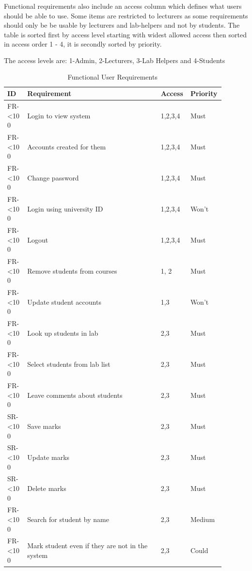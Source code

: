\documentclass[12pt]{article}  %
\newcommand{\rid}[1]{\centering #1-\ifnum\value{requirement}<10 0\fi\arabic{requirement} \stepcounter{requirement}}
\begin{document}
Functional requirements also include an access column which defines what users should be able to use. Some items are restricted to lecturers as some requirements should only be be usable by lecturers and lab-helpers and not by students. The table is sorted first by access level starting with widest allowed access then sorted in access order 1 - 4, it is secondly sorted by priority.

The access levels are: 1-Admin, 2-Lecturers, 3-Lab Helpers and 4-Students

\begin{spacing}{1.5}
\begin{longtable}{|p{0.09\linewidth}|p{0.6\linewidth}|p{0.1\linewidth}|
p{0.1\linewidth}|}
\caption{Functional User Requirements} \label{table:funct-user} \\ \hline
\textbf{ID} & \textbf{Requirement} & \textbf{Access} & \textbf{Priority}\\
\hline \hline

\rowcolor{Gray} \rid{FR} & Login to view system & 1,2,3,4 & Must\\ \hline
\rid{FR} &  Accounts created for them & 1,2,3,4 & Must\\ \hline
\rid{FR} &  Change password & 1,2,3,4 & Must\\ \hline
\rid{FR} &  Login using university ID & 1,2,3,4 & Won't\\ \hline
\rid{FR} &  Logout & 1,2,3,4 & Must \\ \hline

\rid{FR} &  Remove students from courses & 1, 2 & Must\\ \hline
\rid{FR} &  Update student accounts & 1,3 & Won't \\ \hline

\rid{FR} &  Look up students in lab & 2,3 & Must\\ \hline
\rid{FR} &  Select students from lab list & 2,3 & Must\\ \hline
\rid{FR} &  Leave comments about students & 2,3 & Must\\ \hline
\rid{SR} &  Save marks & 2,3 & Must\\ \hline
\rid{SR} &  Update marks & 2,3 & Must\\ \hline
\rid{SR} &  Delete marks & 2,3 & Must\\ \hline
\rid{FR} &  Search for student by name & 2,3 & Medium\\ \hline
\rid{FR} &  Mark student even if they are not in the system & 2,3 & Could \\ \hline


\end{longtable}
\end{spacing}
\end{document}
